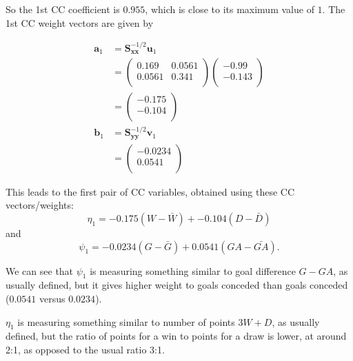 \documentclass[]{book}
\newenvironment{Shaded}{\begin{snugshade}}{\end{snugshade}}
\newcommand{\DecValTok}[1]{\textcolor[rgb]{0.00,0.00,0.81}{#1}}
\newcommand{\NormalTok}[1]{#1}
\newcommand{\OperatorTok}[1]{\textcolor[rgb]{0.81,0.36,0.00}{\textbf{#1}}}
\newcommand{\StringTok}[1]{\textcolor[rgb]{0.31,0.60,0.02}{#1}}
\theoremstyle{definition}
\theoremstyle{definition}
\theoremstyle{definition}
\theoremstyle{remark}
\begin{document}
So the 1st CC coefficient is \(0.955\), which is close to its maximum value of \(1\). The 1st CC weight vectors are
given by

\begin{Shaded}
\end{Shaded}

\begin{align*}
\mathbf a_1&=\mathbf S_{\mathbf x\mathbf x}^{-1/2}\mathbf u_1\\
&=\begin{pmatrix}0.169&0.0561 \\0.0561&0.341 \\\end{pmatrix}\begin{pmatrix}-0.99 \\-0.143 \\\end{pmatrix}\\
&=\begin{pmatrix}-0.175 \\-0.104 \\\end{pmatrix}\\
\mathbf b_1 &=\mathbf S_{\mathbf y\mathbf y}^{-1/2}\mathbf v_1\\
&= \begin{pmatrix}-0.0234 \\0.0541 \\\end{pmatrix}
\end{align*}

This leads to the first pair of CC variables, obtained using these CC vectors/weights:
\[
\eta_1 =-0.175 (W-\bar{W}) +-0.104(D -\bar{D})
\]
and
\[
 \psi_1 = -0.0234(G-\bar{G}) +0.0541(GA-\bar{GA}).
\]

We can see that \(\psi_1\) is measuring something similar to goal difference \(G-GA\), as usually defined, but it gives higher weight to goals conceded than goals conceded (\(0.0541\) versus \(0.0234\)).

\(\eta_1\) is measuring something similar to number of points \(3W+D\), as usually defined, but the ratio of points for a win to points for a draw is lower, at around 2:1, as opposed to the usual ratio 3:1.
\end{document}
